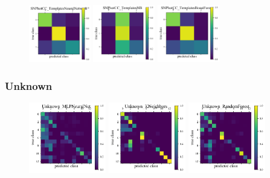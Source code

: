 \begin{figure}
\begin{center}
		\includegraphics[width=0.24\textwidth]{./fig/SNPhotCC_TemplatesNeuralNetwork_cm.png}
		\includegraphics[width=0.24\textwidth]{./fig/SNPhotCC_TemplatesNB_cm.png}
		\includegraphics[width=0.24\textwidth]{./fig/SNPhotCC_TemplatesBoostForest_cm.png}
		\caption{}
		\label{fig:snphotcc_cm}
	\end{center}
\end{figure}

\subsubsection{Unknown}
\label{sec:mystery}

\begin{figure}
	\begin{center}
		\includegraphics[width=0.3\textwidth]{./fig/Unknown_MLPNeuralNet_cm.png}
		\includegraphics[width=0.3\textwidth]{./fig/Unknown_KNeighbors_cm.png}
		\includegraphics[width=0.3\textwidth]{./fig/Unknown_RandomForest_cm.png}
		\caption{}
		\label{fig:unknown_cm}
	\end{center}
\end{figure}
